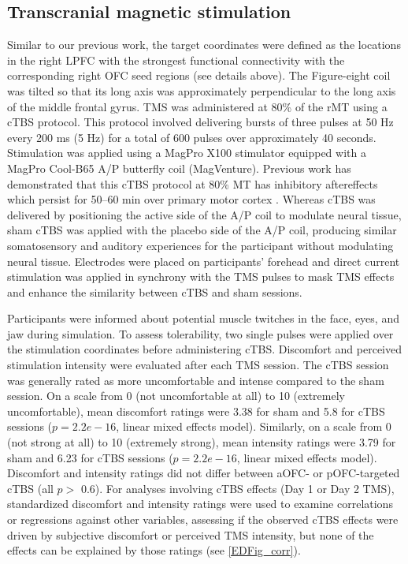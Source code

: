 \documentclass[lineno,sn-basic]{sn-jnl}%
\begin{document}
\subsection{Transcranial magnetic stimulation} 
\label{tms}

Similar to our previous work, the target coordinates were defined as the locations in the right LPFC with the strongest functional connectivity with the corresponding right OFC seed regions (see details above). The Figure-eight coil was tilted so that its long axis was approximately perpendicular to the long axis of the middle frontal gyrus. TMS was administered at 80\% of the rMT using a cTBS protocol. This protocol involved delivering bursts of three pulses at 50 Hz every 200 ms (5 Hz) for a total of 600 pulses over approximately 40 seconds. Stimulation was applied using a MagPro X100 stimulator equipped with a MagPro Cool-B65 A/P butterfly coil (MagVenture). Previous work has demonstrated that this cTBS protocol at 80\% MT has inhibitory aftereffects which persist for 50–60 min over primary motor cortex \citep{RN51}. Whereas cTBS was delivered by positioning the active side of the A/P coil to modulate neural tissue, sham cTBS was applied with the placebo side of the A/P coil, producing similar somatosensory and auditory experiences for the participant without modulating neural tissue. Electrodes were placed on participants' forehead and direct current stimulation was applied in synchrony with the TMS pulses to mask TMS effects and enhance the similarity between cTBS and sham sessions.

Participants were informed about potential muscle twitches in the face, eyes, and jaw during simulation. To assess tolerability, two
single pulses were applied over the stimulation coordinates before
administering cTBS. Discomfort and perceived stimulation intensity were evaluated after each TMS session. The cTBS session was generally rated as more uncomfortable and intense compared to the sham session. On a scale from 0 (not uncomfortable at all) to 10 (extremely uncomfortable), mean discomfort ratings were 3.38 for
sham and 5.8 for cTBS sessions ($p=2.2e-16$, linear mixed effects
model). Similarly, on a scale from 0 (not strong at all) to 10 (extremely strong), mean intensity ratings were 3.79 for sham and 6.23 for cTBS sessions ($p=2.2e-16$, linear mixed effects model). Discomfort and intensity ratings did not differ between aOFC- or pOFC-targeted cTBS (all $p>$ 0.6). For analyses involving cTBS effects (Day 1 or Day 2 TMS), standardized discomfort and intensity ratings were used to examine correlations or regressions against other variables, assessing if the observed cTBS effects were driven by subjective discomfort or perceived TMS intensity, but none of the effects can be explained by those ratings (see \ref{EDFig_corr}).
\end{document}
